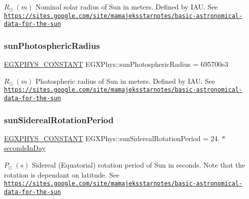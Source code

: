 $ R_{\odot} \ (m)$ Nominal solar radius of Sun in meters. Defined by I\+AU. See \href{https://sites.google.com/site/mamajeksstarnotes/basic-astronomical-data-for-the-sun}{\tt https\+://sites.\+google.\+com/site/mamajeksstarnotes/basic-\/astronomical-\/data-\/for-\/the-\/sun} \mbox{\label{group___e_g_x_phys-_constants-_astrophysics-_solar_system-_sun-_bulk_gac257be308fa17adaf47f3310c5c65377}} 
\subsubsection{\texorpdfstring{sun\+Photospheric\+Radius}{sunPhotosphericRadius}}
{\footnotesize\ttfamily \mbox{\hyperlink{group___e_g_x_phys-_constants-_macros_ga76980d288494ce1714c9ac68a95ba702}{E\+G\+X\+P\+H\+Y\+S\+\_\+\+C\+O\+N\+S\+T\+A\+NT}} E\+G\+X\+Phys\+::sun\+Photospheric\+Radius = 695700e3}

$ R_{\odot} \ (m)$ Photospheric radius of Sun in meters. Defined by I\+AU. See \href{https://sites.google.com/site/mamajeksstarnotes/basic-astronomical-data-for-the-sun}{\tt https\+://sites.\+google.\+com/site/mamajeksstarnotes/basic-\/astronomical-\/data-\/for-\/the-\/sun} \mbox{\label{group___e_g_x_phys-_constants-_astrophysics-_solar_system-_sun-_bulk_gaa33e0ded1617772d751ab5f473db3fbd}} 
\subsubsection{\texorpdfstring{sun\+Sidereal\+Rotation\+Period}{sunSiderealRotationPeriod}}
{\footnotesize\ttfamily \mbox{\hyperlink{group___e_g_x_phys-_constants-_macros_ga76980d288494ce1714c9ac68a95ba702}{E\+G\+X\+P\+H\+Y\+S\+\_\+\+C\+O\+N\+S\+T\+A\+NT}} E\+G\+X\+Phys\+::sun\+Sidereal\+Rotation\+Period = 24. $\ast$ \mbox{\hyperlink{namespace_e_g_x_phys_a93d2a00d75411b58cbf63ab3fd1f8bc2}{seconds\+In\+Day}}}

$P_{\odot} \ (s)$ Sidereal (Equatorial) rotation period of Sun in seconds. Note that the rotation is dependant on latitude. See \href{https://sites.google.com/site/mamajeksstarnotes/basic-astronomical-data-for-the-sun}{\tt https\+://sites.\+google.\+com/site/mamajeksstarnotes/basic-\/astronomical-\/data-\/for-\/the-\/sun} \mbox{\label{group___e_g_x_phys-_constants-_astrophysics-_solar_system-_sun-_bulk_ga17d411dceb8d2ff98b8a270eaa72117d}} 
